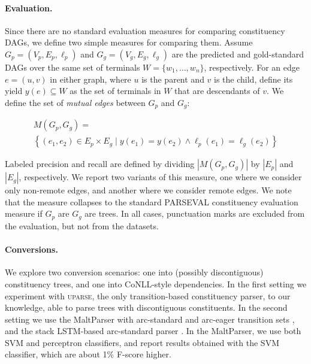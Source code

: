 \documentclass[11pt]{article}
\begin{document}
\paragraph{Evaluation.}
Since there are no standard evaluation measures for comparing constituency DAGs, we define
two simple measures for comparing them.
Assume $G_p=(V_p,E_p,\ell_p)$ and $G_g=(V_g,E_g,\ell_g)$
are the predicted and gold-standard DAGs over the same
set of terminals $W = \{w_1,\ldots,w_n\}$, respectively.
For an edge $e=(u,v)$ in either graph,
where $u$ is the parent and $v$ is the child, define its yield $y(e) \subseteq W$ as the
set of terminals in $W$ that are descendants of $v$.
We define the set of \textit{mutual edges} between $G_p$ and $G_g$:

\vspace{-.5cm}

{\small
\begin{multline*}
    M(G_p,G_g) = \\
    \left\{(e_1,e_2) \in E_p \times E_g \;|\;
    y(e_1) = y(e_2) \wedge \ell_p(e_1)=\ell_g(e_2)\right\}
\end{multline*}
}

\vspace{-.5cm}

Labeled precision and recall are defined by dividing $|M(G_p,G_g)|$ by $|E_p|$ and $|E_g|$, respectively.
We report two variants of this measure, one where we consider only non-remote edges,
and another where we consider remote edges. We note that the measure collapses to the standard
PARSEVAL constituency evaluation measure if $G_p$ are $G_g$ are trees.
In all cases, punctuation marks are excluded from the evaluation, but not from the datasets.


\paragraph{Conversions.}
We explore two conversion scenarios: one into (possibly discontiguous) constituency trees,
and one into CoNLL-style dependencies. In the first setting we experiment with \textsc{uparse},
the only transition-based constituency parser, to our knowledge, able to parse trees with
discontiguous constituents.
In the second setting we use the MaltParser with arc-standard and
arc-eager transition sets \cite{nivre2007maltparser},
and the stack LSTM-based arc-standard parser \cite{dyer2015transition}.
In the MaltParser, we use both SVM and perceptron classifiers, and report
results obtained with the SVM classifier, which are about 1\% F-score higher.
\end{document}

